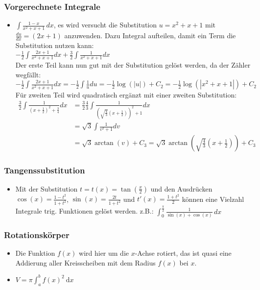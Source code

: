 \documentclass[a3paper, 11pt, landscape]{scrartcl}
\begin{document}
\begin{multicols*}{3}
	\subsubsection{Vorgerechnete Integrale}
\begin{itemize}
    \item $\int \frac{1-x}{x^2+x+1}\,dx$, es wird versucht die Substitution $u=x^2+x+1$ mit $\frac{du}{dx}=(2x +1)$ anzuwenden. Dazu Integral aufteilen, damit ein Term die Substitution nutzen kann:\\
    $-\frac{1}{2} \int \frac{2 x+1}{x^{2}+x+1} d x+\frac{3}{2} \int \frac{1}{x^{2}+x+1} d x$\\
    Der erste Teil kann nun gut mit der Substitution gelöst werden, da der Zähler wegfällt:\\
    $-\frac{1}{2} \int \frac{2 x+1}{x^{2}+x+1} d x=-\frac{1}{2} \int \frac{1}{u} d u=-\frac{1}{2} \log (|u|)+C_{2}=-\frac{1}{2} \log \left(\left|x^{2}+x+1\right|\right)+C_{2}$\\Für zweiten Teil wird quadratisch ergänzt mit einer zweiten Substitution:\\
    $\begin{aligned}
\frac{3}{2} \int \frac{1}{\left(x+\frac{1}{2}\right)^{2}+\frac{3}{4}} d x &=\frac{3}{2} \frac{4}{3} \int \frac{1}{\left(\sqrt{\frac{4}{3}}\left(x+\frac{1}{2}\right)\right)^{2}+1} d x \\
&=\sqrt{3} \int \frac{1}{v^{2}+1} d v \\
&=\sqrt{3} \arctan (v)+C_{3}=\sqrt{3} \arctan \left(\sqrt{\frac{4}{3}}\left(x+\frac{1}{2}\right)\right)+C_{3}
\end{aligned}$
\end{itemize}
	
	\subsubsection{Tangenssubstitution}
	\begin{itemize}
	    \item Mit der Substitution $t = t(x)= \tan (\frac{x}{2})$ und den Ausdrücken $\cos(x)=\frac{1-t^2}{1+t^2}$, $\sin (x)=\frac{2t}{1+t^2}$ und $t'(x)=\frac{1+t^2}{2}$ können eine Vielzahl Integrale trig. Funktionen gelöst werden. z.B.: $\int_0^{\frac{\pi}{2}}\frac{1}{\sin(x)+\cos(x)}\,dx$
	\end{itemize}
	
	\subsubsection{Rotationskörper}
	\begin{itemize}
	    \item Die Funktion $f(x)$ wird hier um die $x$-Achse rotiert, das ist quasi eine Addierung aller Kreisscheiben mit dem Radius $f(x)$ bei $x$.
	    \item $V=\pi \int_{a}^{b} f(x)^{2} \mathrm{~d} x$
	\end{itemize}
	

\end{multicols*}
\end{document}
